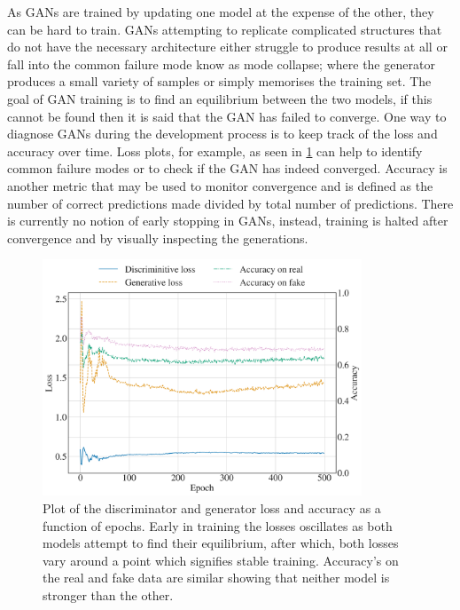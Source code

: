 \documentclass[12pt]{iopart}
\begin{document}
As \acp{GAN} are trained by updating one model at the expense of the other, they can be hard to train. GANs attempting to replicate complicated structures that do not
have the necessary architecture either struggle to produce results at all or
fall into the common failure mode know as mode collapse; where the generator
produces a small variety of samples or simply memorises the training set. The goal of GAN training is to find an equilibrium between the two models, if this cannot be found then it is said that the \ac{GAN} has failed to converge. One way to diagnose \acp{GAN} during the development process is to keep track of the loss and accuracy over time. Loss plots, for example, as seen in \cref{fig:lossplot} can help to identify common failure modes or to check if the \ac{GAN} has indeed converged. Accuracy is another metric that may be used to monitor convergence and is defined as the number of correct predictions made divided by total number of predictions. There is currently no notion of early stopping in \acp{GAN}, instead, training is halted after convergence and by visually inspecting the generations. 
\begin{figure}[h!]
    \centering
    \includegraphics[width=0.85\textwidth]{figures/losses.png}
    \caption{Plot of the discriminator and generator loss and accuracy as a function of epochs. Early in training the losses oscillates as both models attempt to find their equilibrium, after which, both losses vary around a point which signifies stable training. Accuracy's on the real and fake data are similar showing that neither model is stronger than the other.}
    \label{fig:lossplot}
\end{figure}

\end{document}
